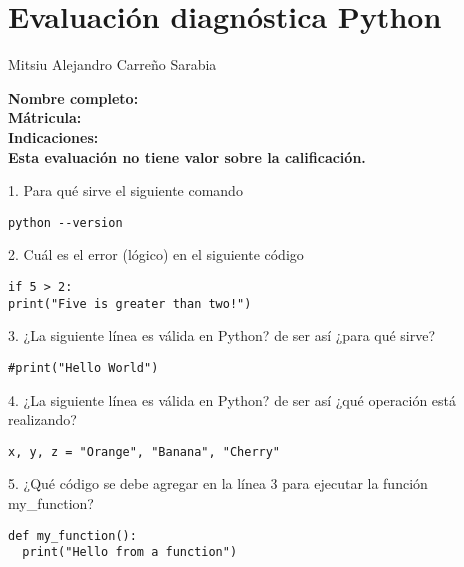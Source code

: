 \documentclass[10pt]{article}
\begin{document}
\section*{Evaluación diagnóstica Python}
\textmd{Mitsiu Alejandro Carreño Sarabia}

\noindent
\textbf{Nombre completo:} \underline{\hspace{10cm}} \\
\textbf{Mátricula:} \underline{\hspace{10cm}} \\

\noindent \textbf{Indicaciones:}
 \\
\textbf{Esta evaluación no tiene valor sobre la calificación.}
\vspace{0.3cm}

\textmd{1. Para qué sirve el siguiente comando }
\begin{lstlisting}
python --version
\end{lstlisting}

\vspace{2cm} %

\textmd{2. Cuál es el error (lógico) en el siguiente código}
\begin{lstlisting}
if 5 > 2:
print("Five is greater than two!")
\end{lstlisting}

\vspace{4cm} %

\textmd{3. ¿La siguiente línea es válida en Python? de ser así ¿para qué sirve?}
\begin{lstlisting}
#print("Hello World")
\end{lstlisting}

\vspace{2cm} %

\textmd{4. ¿La siguiente línea es válida en Python? de ser así ¿qué operación está realizando?}
\begin{lstlisting}
x, y, z = "Orange", "Banana", "Cherry"
\end{lstlisting}

\vspace{3cm} %

\textmd{5. ¿Qué código se debe agregar en la línea 3 para ejecutar la función my\_function?}
\begin{lstlisting}
def my_function():
  print("Hello from a function")

\end{lstlisting}
\end{document}
